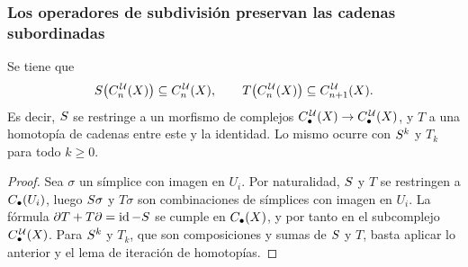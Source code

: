 \begin{frame}
  \frametitle{Los operadores de subdivisión preservan las cadenas subordinadas}

  \begin{proposition}
    Se tiene que
    \[
      S\bigl(C^{\mkern2mu\mathcal{U}}_n(X)\bigr)\subseteq C^{\mkern2mu\mathcal{U}}_n(X),
      \qquad
      T\bigl(C^{\mkern2mu\mathcal{U}}_n(X)\bigr)\subseteq C^{\mkern2mu\mathcal{U}}_{n+1}(X).
    \]
    Es decir, $S$ se restringe a un morfismo de complejos
    $C^{\mkern2mu\mathcal{U}}_\bullet(X)\to C^{\mkern2mu\mathcal{U}}_\bullet(X)$, y $T$ a una homotopía de cadenas
    entre este y la identidad. Lo mismo ocurre con $S^k$ y $T_k$ para
    todo $k\geq0$.
  \end{proposition}

  \begin{proof}
    Sea $\sigma$ un símplice con imagen en $U_i$. Por naturalidad, $S$ y
    $T$ se restringen a $C_\bullet(U_i)$, luego $S\sigma$ y $T\sigma$
    son combinaciones de símplices con imagen en $U_i$. La fórmula
    $\partial T+T\partial=\operatorname{id}-S$ se cumple en $C_\bullet(X)$, y por
    tanto en el subcomplejo $C^{\mkern2mu\mathcal{U}}_\bullet(X)$. Para $S^k$ y $T_k$, que
    son composiciones y sumas de $S$ y $T$, basta aplicar lo anterior y
    el lema de iteración de homotopías.
  \end{proof}
\end{frame}

